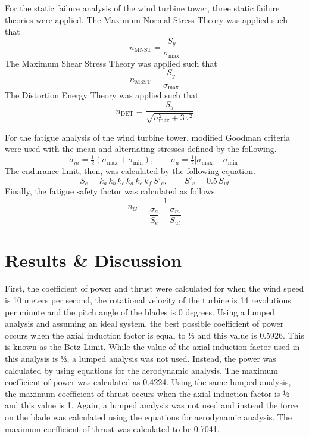 \documentclass[11pt]{article}
\begin{document}
For the static failure analysis of the wind turbine tower, three static failure theories were applied. The Maximum Normal Stress Theory was applied such that
\begin{equation}
 n_{\text{MNST}} = \frac{S_y}{\sigma_\text{max}}
\label{eq:mnst}
\end{equation}
The Maximum Shear Stress Theory was applied such that
\begin{equation}
 n_{\text{MSST}} = \frac{S_y}{\sigma_\text{max}}
\label{eq:msst}
\end{equation}
The Distortion Energy Theory was applied such that
\begin{equation}
 n_{\text{DET}} = \frac{S_y}{\sqrt{\sigma_\text{max}^{2} + 3\,\tau^{2}}}
\label{eq:det}
\end{equation}

For the fatigue analysis of the wind turbine tower, modified Goodman criteria were used with the mean and alternating stresses defined by the following.
\begin{equation}
 \sigma_m = \tfrac{1}{2}(\sigma_{\text{max}}+\sigma_{\text{min}}), \qquad \sigma_a = \tfrac{1}{2}|\sigma_{\text{max}}-\sigma_{\text{min}}|
\label{eq:mean_alt}
\end{equation}
The endurance limit, then, was calculated by the following equation.
\begin{equation}
 S_e = k_a\,k_b\,k_c\,k_d\,k_e\,k_f\,S'_e, \qquad S'_e = 0.5\,S_{ut}
\label{eq:Se}
\end{equation}
Finally, the fatigue safety factor was calculated as follows.
\begin{equation}
 n_G = \frac{1}{\dfrac{\sigma_a}{S_e} + \dfrac{\sigma_m}{S_{ut}}}
\label{eq:goodman}
\end{equation}

\section{Results & Discussion}
First, the coefficient of power and thrust were calculated for when the wind speed is 10 meters per second, the rotational velocity of the turbine is 14 revolutions per minute and the pitch angle of the blades is 0 degrees. Using a lumped analysis and assuming an ideal system, the best possible coefficient of power occurs when the axial induction factor is equal to ⅓ and this value is 0.5926. This is known as the Betz Limit. While the value of the axial induction factor used in this analysis is ⅓, a lumped analysis was not used. Instead, the power was calculated by using equations for the aerodynamic analysis. The maximum coefficient of power was calculated as 0.4224.
Using the same lumped analysis, the maximum coefficient of thrust occurs when the axial induction factor is ½ and this value is 1. Again, a lumped analysis was not used and instead the force on the blade was calculated using the equations for aerodynamic analysis.  The maximum coefficient of thrust was calculated to be 0.7041. 
\end{document}
